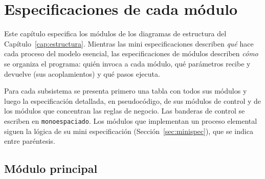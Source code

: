 \chapter{Especificaciones de cada módulo}
\label{cap:modulos}

Este capítulo especifica los módulos de los diagramas de estructura del
Capítulo~\ref{cap:estructura}. Mientras las mini especificaciones describen \emph{qué} hace
cada proceso del modelo esencial, las especificaciones de módulos describen \emph{cómo} se
organiza el programa: quién invoca a cada módulo, qué parámetros recibe y devuelve (sus
acoplamientos) y qué pasos ejecuta.

Para cada subsistema se presenta primero una tabla con todos sus módulos y luego la
especificación detallada, en pseudocódigo, de sus módulos de control y de los módulos que
concentran las reglas de negocio. Las banderas de control se escriben en
\texttt{monoespaciado}. Los módulos que implementan un proceso elemental siguen la lógica de
su mini especificación (Sección~\ref{sec:minispec}), que se indica entre paréntesis.

\section{Módulo principal}


